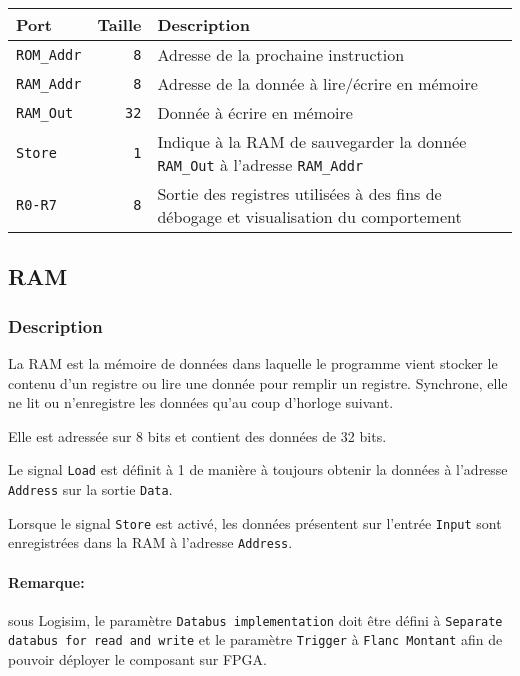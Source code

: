 
\begin{tabular}{|l|r|l|}
\hline 
\textbf{Port} & \textbf{Taille} & \textbf{Description}\\
\hline

\hline
\texttt{ROM\_Addr}		&  \texttt{8} & Adresse de la prochaine instruction\\
\hline
\texttt{RAM\_Addr}		&  \texttt{8} & Adresse de la donnée à lire/écrire en mémoire\\
\hline
\texttt{RAM\_Out}		& \texttt{32} & Donnée à écrire en mémoire\\
\hline
\texttt{Store}			&  \texttt{1} & Indique à la RAM de sauvegarder la donnée \texttt{RAM\_Out} à l'adresse \texttt{RAM\_Addr}\\
\hline
\texttt{R0-R7}			& \texttt{8\times 32} & Sortie des registres utilisées à des fins de débogage et visualisation du comportement\\


\hline
\end{tabular}



\subsection{RAM}

\subsubsection{Description}

La RAM est la mémoire de données dans laquelle le programme vient stocker le contenu d'un registre ou lire une donnée pour remplir un registre.
Synchrone, elle ne lit ou n'enregistre les données qu'au coup d'horloge suivant.

Elle est adressée sur 8 bits et contient des données de 32 bits.

Le signal \texttt{Load} est définit à 1 de manière à toujours obtenir la données à l'adresse \texttt{Address} sur la sortie \texttt{Data}.

Lorsque le signal \texttt{Store} est activé, les données présentent sur l'entrée \texttt{Input} sont enregistrées dans la RAM à l'adresse \texttt{Address}.

\paragraph{Remarque:} sous Logisim, le paramètre \texttt{Databus implementation} doit être défini à \texttt{Separate databus for read and write} 
et le paramètre \texttt{Trigger} à \texttt{Flanc Montant} afin de pouvoir déployer le composant sur FPGA.

